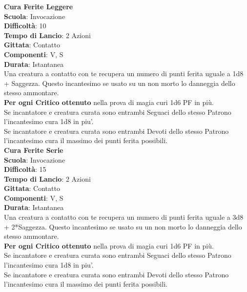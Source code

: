 \begin{multicols}{2}
\medskip\textbf{Cura Ferite Leggere}\\
\textbf{Scuola}: Invocazione\\
\textbf{Difficoltà}:  10\\
\textbf{Tempo di Lancio}: 2 Azioni\\
\textbf{Gittata}: Contatto\\
\textbf{Componenti}: V, S\\
\textbf{Durata}: Istantanea\\
Una creatura a contatto con te recupera un numero di punti ferita uguale a 1d8 + Saggezza. Questo incantesimo se usato su un non morto lo danneggia dello stesso ammontare.\\
\textbf{Per ogni Critico ottenuto} nella prova di magia curi 1d6 PF in più.\\
Se incantatore e creatura curata sono entrambi Seguaci dello stesso Patrono l'incantesimo cura 1d8 in piu'.\\
Se incantatore e creatura curata sono entrambi Devoti dello stesso Patrono l'incantesimo cura il massimo dei punti ferita possibili.\\

\medskip\textbf{Cura Ferite Serie}\\
\textbf{Scuola}: Invocazione\\
\textbf{Difficoltà}:  15\\
\textbf{Tempo di Lancio}: 2 Azioni\\
\textbf{Gittata}: Contatto\\
\textbf{Componenti}: V, S\\
\textbf{Durata}: Istantanea\\
Una creatura a contatto con te recupera un numero di punti ferita uguale a 3d8 + 2*Saggezza. Questo incantesimo se usato su un non morto lo danneggia dello stesso ammontare.\\
\textbf{Per ogni Critico ottenuto} nella prova di magia curi 1d6 PF in più.\\
Se incantatore e creatura curata sono entrambi Seguaci dello stesso Patrono l'incantesimo cura 1d8 in piu'.\\
Se incantatore e creatura curata sono entrambi Devoti dello stesso Patrono l'incantesimo cura il massimo dei punti ferita possibili.\\


\end{multicols}
